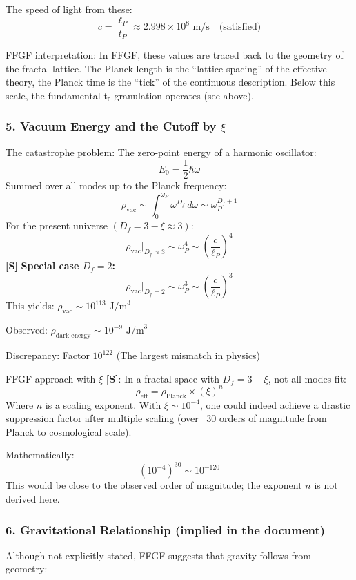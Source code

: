 	The speed of light from these:
	\[
	c = \frac{\ell_P}{t_P} \approx 2.998 \times 10^8 \text{ m/s} \quad \text{(satisfied)}
	\]
	
	FFGF interpretation:
	In FFGF, these values are traced back to the geometry of the fractal lattice. The Planck length is the ``lattice spacing'' of the effective theory, the Planck time is the ``tick'' of the continuous description. Below this scale, the fundamental t₀ granulation operates (see above).
	
	\subsubsection{5. Vacuum Energy and the Cutoff by \( \xi \)}
	The catastrophe problem:
	The zero-point energy of a harmonic oscillator:
	\[
	E_0 = \frac{1}{2}\hbar\omega
	\]
	Summed over all modes up to the Planck frequency:
	\[
	\rho_{\text{vac}} \sim \int_0^{\omega_P} \omega^{D_f} \, d\omega \sim \omega_P^{D_f+1}
	\]
	For the present universe \((D_f = 3-\xi \approx 3)\):
	\[
	\rho_{\text{vac}}\big|_{D_f \approx 3} \sim \omega_P^4 \sim \left(\frac{c}{\ell_P}\right)^4
	\]
	\textbf{[S]} \textbf{Special case \(D_f = 2\):}
	\[
	\rho_{\text{vac}}\big|_{D_f=2} \sim \omega_P^3 \sim \left(\frac{c}{\ell_P}\right)^3
	\]
	This yields: \( \rho_{\text{vac}} \sim 10^{113} \text{ J/m}^3 \)
	
	Observed: \( \rho_{\text{dark energy}} \sim 10^{-9} \text{ J/m}^3 \)
	
	Discrepancy: Factor \( 10^{122} \) (The largest mismatch in physics)
	
	FFGF approach with \( \xi \) \textbf{[S]}:
	In a fractal space with \( D_f = 3 - \xi \), not all modes fit:
	\[
	\rho_{\text{eff}} = \rho_{\text{Planck}} \times (\xi)^n
	\]
	Where \( n \) is a scaling exponent. With \( \xi \sim 10^{-4} \), one could indeed achieve a drastic suppression factor after multiple scaling (over ~30 orders of magnitude from Planck to cosmological scale).
	
	Mathematically:
	\[
	(10^{-4})^{30} \sim 10^{-120}
	\]
	This would be close to the observed order of magnitude; the exponent \( n \) is not derived here.
	
	\subsubsection{6. Gravitational Relationship (implied in the document)}
	Although not explicitly stated, FFGF suggests that gravity follows from geometry:
	
